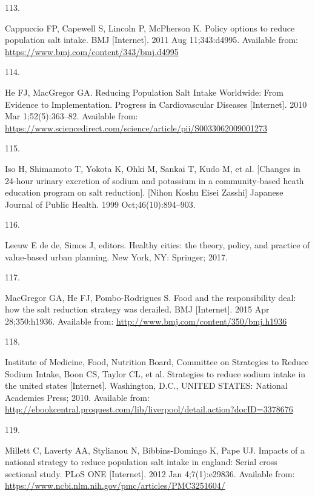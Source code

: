 \documentclass[
]{article}
\newlength{\cslhangindent}
\newlength{\csllabelwidth}
\newlength{\cslentryspacingunit} %
\newenvironment{CSLReferences}[2] %
 {%
  \setlength{\parindent}{0pt}
  \ifodd #1
  \let\oldpar\par
  \def\par{\hangindent=\cslhangindent\oldpar}
  \fi
  \setlength{\parskip}{#2\cslentryspacingunit}
 }%
 {}
\newcommand{\CSLLeftMargin}[1]{\parbox[t]{\csllabelwidth}{#1}}
\newcommand{\CSLRightInline}[1]{\parbox[t]{\linewidth - \csllabelwidth}{#1}\break}
\begin{document}
\begin{CSLReferences}{0}{0}
\leavevmode{}%
\CSLLeftMargin{113. }%
\CSLRightInline{Cappuccio FP, Capewell S, Lincoln P, McPherson K. Policy
options to reduce population salt intake. BMJ {[}Internet{]}. 2011 Aug
11;343:d4995. Available from:
\url{https://www.bmj.com/content/343/bmj.d4995}}

\leavevmode{}%
\CSLLeftMargin{114. }%
\CSLRightInline{He FJ, MacGregor GA. Reducing Population Salt Intake
Worldwide: From Evidence to Implementation. Progress in Cardiovascular
Diseases {[}Internet{]}. 2010 Mar 1;52(5):363--82. Available from:
\url{https://www.sciencedirect.com/science/article/pii/S0033062009001273}}

\leavevmode{}%
\CSLLeftMargin{115. }%
\CSLRightInline{Iso H, Shimamoto T, Yokota K, Ohki M, Sankai T, Kudo M,
et al. {[}Changes in 24-hour urinary excretion of sodium and potassium
in a community-based heath education program on salt reduction{]}.
{[}Nihon Koshu Eisei Zasshi{]} Japanese Journal of Public Health. 1999
Oct;46(10):894--903. }

\leavevmode{}%
\CSLLeftMargin{116. }%
\CSLRightInline{Leeuw E de de, Simos J, editors. Healthy cities: the
theory, policy, and practice of value-based urban planning. New York,
NY: Springer; 2017. }

\leavevmode{}%
\CSLLeftMargin{117. }%
\CSLRightInline{MacGregor GA, He FJ, Pombo-Rodrigues S. Food and the
responsibility deal: how the salt reduction strategy was derailed. BMJ
{[}Internet{]}. 2015 Apr 28;350:h1936. Available from:
\url{http://www.bmj.com/content/350/bmj.h1936}}

\leavevmode{}%
\CSLLeftMargin{118. }%
\CSLRightInline{Institute of Medicine, Food, Nutrition Board, Committee
on Strategies to Reduce Sodium Intake, Boon CS, Taylor CL, et al.
Strategies to reduce sodium intake in the united states {[}Internet{]}.
Washington, D.C., UNITED STATES: National Academies Press; 2010.
Available from:
\url{http://ebookcentral.proquest.com/lib/liverpool/detail.action?docID=3378676}}

\leavevmode{}%
\CSLLeftMargin{119. }%
\CSLRightInline{Millett C, Laverty AA, Stylianou N, Bibbins-Domingo K,
Pape UJ. Impacts of a national strategy to reduce population salt intake
in england: Serial cross sectional study. PLoS ONE {[}Internet{]}. 2012
Jan 4;7(1):e29836. Available from:
\url{https://www.ncbi.nlm.nih.gov/pmc/articles/PMC3251604/}}


\end{CSLReferences}
\end{document}
